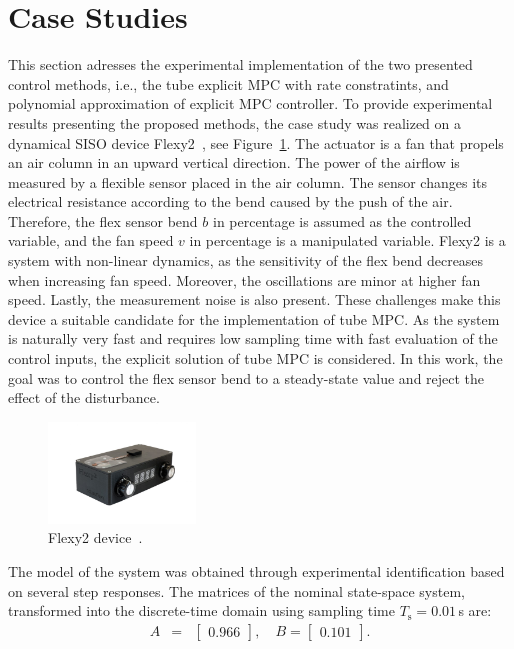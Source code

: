 \documentclass[letterpaper, 10 pt, conference]{ieeeconf}
\begin{document}
\section{Case Studies}
\label{sec:case_study}
This section adresses the experimental implementation of the two presented control methods, i.e., the tube explicit MPC with rate constratints, and polynomial approximation of explicit MPC controller. To provide experimental results presenting the proposed methods, the case study was realized on a dynamical SISO device Flexy2~\cite{flexy2}, see Figure~\ref{fig:flexy2}. The actuator is a fan that propels an air column in an upward vertical direction. The power of the airflow is measured
by a flexible sensor placed in the air column. The sensor changes its electrical resistance according to the bend caused by the push of the air. Therefore, the flex sensor bend $b$ in percentage is assumed as the controlled variable, and the fan speed $v$ in percentage is a manipulated variable. Flexy2 is a system with non-linear dynamics, as the sensitivity of the flex bend decreases when increasing fan speed. Moreover, the oscillations are minor at higher fan speed. Lastly, the measurement noise is also present. These challenges make this device a suitable candidate for the implementation of tube MPC. As the system is naturally very fast and requires low sampling time with fast evaluation of the control inputs, the explicit solution of tube MPC is considered. In this work, the goal was to control the flex sensor bend to a steady-state value and reject the effect of the disturbance.

\begin{figure}
	\begin{center}
		\includegraphics[width=0.35\textwidth]{images/flexy2}
		\caption{Flexy2 device~\cite{flexy2}.}
		\label{fig:flexy2}
	\end{center}
\end{figure}

The model of the system was obtained through experimental identification based on several step responses. The matrices of the nominal state-space system, transformed into the discrete-time domain using sampling time $T_\mathrm{s} = 0.01$\,s are:
\begin{subequations}
	\label{eq:model_A_B} 
	\begin{eqnarray}
		A &=& \begin{bmatrix}
			0.966
		\end{bmatrix}, \quad %
		B = \begin{bmatrix}
			0.101
		\end{bmatrix}. 
	\end{eqnarray}
\end{subequations}
\end{document}
